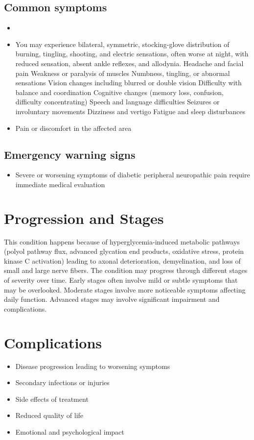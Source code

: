 \subsection{Common symptoms}
\begin{itemize}[noitemsep]
  \item \item You may experience bilateral, symmetric, stocking-glove distribution of burning, tingling, shooting, and electric sensations, often worse at night, with reduced sensation, absent ankle reflexes, and allodynia. Headache and facial pain Weakness or paralysis of muscles Numbness, tingling, or abnormal sensations Vision changes including blurred or double vision Difficulty with balance and coordination Cognitive changes (memory loss, confusion, difficulty concentrating) Speech and language difficulties Seizures or involuntary movements Dizziness and vertigo Fatigue and sleep disturbances
  \item Pain or discomfort in the affected area
  \end{itemize}
\subsection{Emergency warning signs}
\begin{itemize}[noitemsep]
  \item Severe or worsening symptoms of diabetic peripheral neuropathic pain require immediate medical evaluation
\end{itemize}
\section{Progression and Stages}
This condition happens because of hyperglycemia-induced metabolic pathways (polyol pathway flux, advanced glycation end products, oxidative stress, protein kinase C activation) leading to axonal deterioration, demyelination, and loss of small and large nerve fibers. The condition may progress through different stages of severity over time. Early stages often involve mild or subtle symptoms that may be overlooked. Moderate stages involve more noticeable symptoms affecting daily function. Advanced stages may involve significant impairment and complications.
\section{Complications}
\begin{itemize}[noitemsep]
  \item Disease progression leading to worsening symptoms
  \item Secondary infections or injuries
  \item Side effects of treatment
  \item Reduced quality of life
  \item Emotional and psychological impact
\end{itemize}
